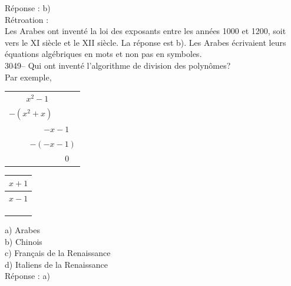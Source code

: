 \documentclass[letterpaper, 12pt]{article}
\begin{document}
R\'eponse : b)\\

R\'etroation :\\
Les Arabes ont invent\'e la loi des exposants entre les ann\'ees 1000 et 1200, soit vers le {\scriptsize XI\ieme{}} si\`ecle et le {\scriptsize XII\ieme{}} si\`ecle. La r\'eponse est b). Les Arabes \'ecrivaient leurs \'equations alg\'ebriques en mots et non pas en symboles.\\



3049-- Qui ont invent\'e l'algorithme de division des polyn\^omes?\\
Par exemple,
\begin{center}
\begin{tabular}{r}
$x^{2} - 1$ \ \ \ \ \ \ \\
\underline{$- (x^{2} + x)$} \ \ \ \  \ \\
$- x - 1$ \ \\
\underline{$- (-x - 1)$}\\
$0$ \
\end{tabular}
\begin{tabular}{|c}
$x + 1$ \\ \hline
$x - 1$\\
\\
\\
\\
\end{tabular}
\end{center}

a) Arabes\\
b) Chinois\\
c) Fran\c cais de la Renaissance\\
d) Italiens de la Renaissance\\

R\'eponse : a)\\
\end{document}
